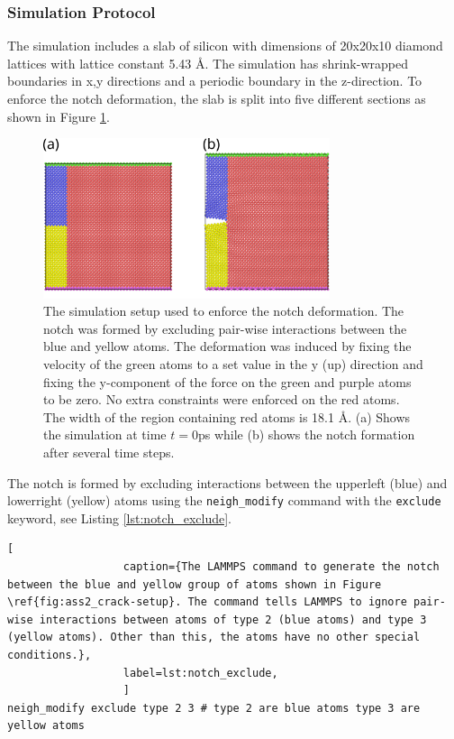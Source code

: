 \documentclass[10pt,a4paper]{labreport}
\begin{document}
\subsubsection{Simulation Protocol}
The simulation includes a slab of silicon with dimensions of 20x20x10 diamond lattices with lattice constant 5.43 \AA. The simulation has shrink-wrapped boundaries in x,y directions and a periodic boundary in the z-direction. 
To enforce the notch deformation, the slab is split into five different sections as shown in Figure \ref{fig:ass2_crack-setup}. 
\begin{figure}[h]
  \centering
  \includegraphics[width=0.75\textwidth]{figs/ass2_crack_setup.png}
  \caption{The simulation setup used to enforce the notch deformation. The notch was formed by excluding pair-wise interactions between the blue and yellow atoms. The deformation was induced by fixing the velocity of the green atoms to a set value in the y (up) direction and fixing the y-component of the force on the green and purple atoms to be zero. No extra constraints were enforced on the red atoms. The width of the region containing red atoms is 18.1 \AA. (a) Shows the simulation at time $t=0$ps while (b) shows the notch formation after several time steps. }
  \label{fig:ass2_crack-setup}
\end{figure}

The notch is formed by excluding interactions between the upperleft (blue) and lowerright (yellow) atoms using the \texttt{neigh\_modify} command with the \texttt{exclude} keyword, see Listing \ref{lst:notch_exclude}.

\begin{lstlisting}[
                  caption={The LAMMPS command to generate the notch between the blue and yellow group of atoms shown in Figure \ref{fig:ass2_crack-setup}. The command tells LAMMPS to ignore pair-wise interactions between atoms of type 2 (blue atoms) and type 3 (yellow atoms). Other than this, the atoms have no other special conditions.},
                  label=lst:notch_exclude,
                  ]
neigh_modify exclude type 2 3 # type 2 are blue atoms type 3 are yellow atoms
\end{lstlisting}
\end{document}
